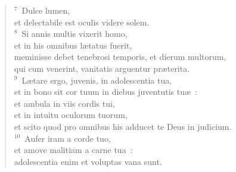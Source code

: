 \begin{flushleft}\begin{verse}${}^{7}$~Dulce lumen,\\ et delectabile est oculis videre solem.\\
${}^{8}$~Si annis multis vixerit homo,\\ et in his omnibus l\ae tatus fuerit,\\ meminisse debet tenebrosi temporis, et dierum multorum,\\ qui cum venerint, vanitatis arguentur pr\ae terita.\\
${}^{9}$~L\ae tare ergo, juvenis, in adolescentia tua,\\ et in bono sit cor tuum in diebus juventutis tu\ae~:\\ et ambula in viis cordis tui,\\ et in intuitu oculorum tuorum,\\ et scito quod pro omnibus his adducet te Deus in judicium.\\
${}^{10}$~Aufer iram a corde tuo,\\ et amove malitiam a carne tua~:\\ adolescentia enim et voluptas vana sunt.\end{verse}\end{flushleft}


